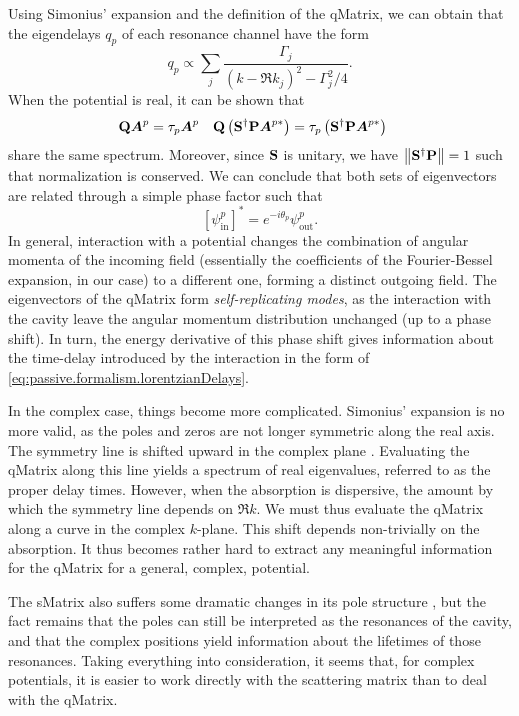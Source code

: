 Using Simonius' expansion and the definition of the \gls{qMatrix}, we can obtain that
the eigendelays $q_p$ of each resonance channel have the form
  \begin{equation}
   \label{eq:passive.formalism.lorentzianDelays}
   q_p \propto \sum_j \frac{\Gamma_j}{\left(k-\Re{k_j}\right)^2-\Gamma_j^2/4}.
  \end{equation}
When the potential is real, it can be shown that 
	\begin{align}
		\mathbf{Q}\boldsymbol{A}^p	&= \tau_p\boldsymbol{A}^p &
		\mathbf{Q}\left(\mathbf{S}^\dagger\mathbf{P}\boldsymbol{A}^{p*}\right)	&=\tau_p\left(\mathbf{S}^\dagger\mathbf{P}\boldsymbol{A}^{p*}\right)
	\end{align}
share the same spectrum. Moreover, since $\mathbf{S}$ is unitary, we have 
$\left\|\mathbf{S^\dagger P}\right\|=1$ such that normalization is conserved. 
We can conclude that both sets of eigenvectors are related through a simple
phase factor such that
	\begin{equation}
		\left[\psi^p_\text{in}\right]^* = e^{-i\theta_p}\psi^p_\text{out}.
	\end{equation}
In general, interaction with a potential changes the combination
of angular momenta of the incoming field (essentially the coefficients
of the Fourier-Bessel expansion, in our case) to a different one, 
forming a distinct outgoing field. The eigenvectors of the \gls{qMatrix}
form \textit{self-replicating modes}, as the interaction with the cavity
leave the angular momentum distribution unchanged (up to a phase shift). 
In turn, the energy derivative of this phase shift
gives information about the time-delay introduced 
by the interaction in the form of \eqref{eq:passive.formalism.lorentzianDelays}.

In the complex case, things become more complicated. Simonius' 
expansion is no more valid, as the poles and zeros are not 
longer symmetric along the real axis. The symmetry line
is shifted upward in the complex plane \cite{SAV2003,FYO2005}. 
Evaluating the \gls{qMatrix} along this line yields
a spectrum of real eigenvalues, referred to as the proper delay times. 
However, when the absorption is dispersive, the amount by which the symmetry
line depends on $\Re{k}$. We must thus evaluate the \gls{qMatrix} along
a curve in the complex $k$-plane. This shift depends non-trivially
on the absorption. It thus becomes rather hard to extract any meaningful
information for the \gls{qMatrix} for a general, complex, potential. 

\label{sec:passive.formalism.SpoleStructure}The \gls{sMatrix} also suffers some dramatic changes in its pole structure
\cite{JOF1973,KOK1981,CAS1982}, but the fact remains that the poles can still be
interpreted as the resonances of the cavity, and that the complex positions
yield information about the lifetimes of those resonances. Taking everything
into consideration, it seems that, for complex potentials, it is easier to 
work directly with the scattering matrix than to deal with the \gls{qMatrix}.

